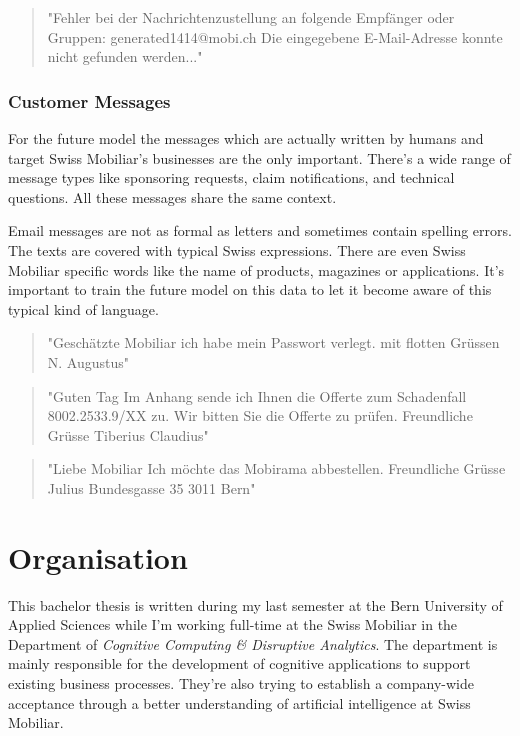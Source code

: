 \begin{quote}
    "Fehler bei der Nachrichtenzustellung an folgende Empfänger oder Gruppen: generated1414@mobi.ch Die eingegebene E-Mail-Adresse konnte nicht gefunden werden..."
\end{quote}

\subsubsection{Customer Messages}

For the future model the messages which are actually written by humans and target Swiss Mobiliar's businesses are the only important.
There's a wide range of message types like sponsoring requests, claim notifications, and technical questions. All these messages
share the same context.

Email messages are not as formal as letters and sometimes contain spelling errors. The texts are covered with typical Swiss expressions.
There are even Swiss Mobiliar specific words like the name of products, magazines or applications. It's important to train the future
model on this data to let it become aware of this typical kind of language.

\begin{quote}
    "Geschätzte Mobiliar ich habe mein Passwort verlegt. mit flotten Grüssen N. Augustus"
\end{quote}

\begin{quote}
    "Guten Tag Im Anhang sende ich Ihnen die Offerte zum Schadenfall 8002.2533.9/XX zu. Wir bitten Sie die Offerte zu prüfen. Freundliche Grüsse Tiberius Claudius"
\end{quote}

\begin{quote}
    "Liebe Mobiliar Ich möchte das Mobirama abbestellen. Freundliche Grüsse Julius Bundesgasse 35 3011 Bern"
\end{quote}

\section{Organisation}

This bachelor thesis is written during my last semester at the Bern University of Applied Sciences while I'm working full-time
at the Swiss Mobiliar in the Department of \emph{Cognitive Computing \& Disruptive Analytics}. The department is mainly responsible
for the development of cognitive applications to support existing business processes. They're also trying to establish a
company-wide acceptance through a better understanding of artificial intelligence at Swiss Mobiliar.

